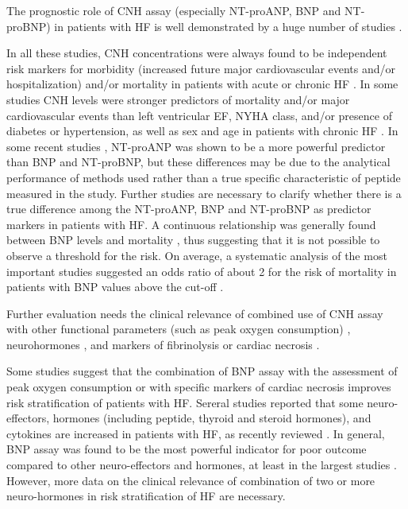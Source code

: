 \documentclass[14pt,a4paper,onecolumn]{extarticle}
\begin{document}
The prognostic role of CNH assay (especially NT-proANP, BNP and NT-proBNP) in
patients with HF is well demonstrated by a huge number of studies \citep{bib316} \citep{bib3147} \citep{bib3186} \citep{bib3187} \citep{bib3188} \citep{bib3189} \citep{bib3190} \citep{bib3191} \citep{bib3192} \citep{bib3193} \citep{bib3194} \citep{bib3195} \citep{bib3196} \citep{bib3197} \citep{bib3198} \citep{bib3199}.

In all these studies, CNH concentrations were always found to be independent risk
markers for morbidity (increased future major cardiovascular events and/or hospitalization) and/or mortality in patients with acute or chronic HF \citep{bib35}. In some studies CNH
levels were stronger predictors of mortality and/or major cardiovascular events than left
ventricular EF, NYHA class, and/or presence of diabetes or hypertension, as well as sex
and age in patients with chronic HF \citep{bib3188} \citep{bib3189} \citep{bib3192} \citep{bib3194} \citep{bib3195} \citep{bib3196} \citep{bib3198} \citep{bib3199}. In some recent studies \citep{bib3197} \citep{bib3199}, NT-proANP was shown to be a more powerful predictor than BNP and
NT-proBNP, but these differences may be due to the analytical performance of methods
used rather than a true specific characteristic of peptide measured in the study. Further
studies are necessary to clarify whether there is a true difference among the NT-proANP,
BNP and NT-proBNP as predictor markers in patients with HF.
A continuous relationship was generally found between BNP levels and mortality
\citep{bib3194}, thus suggesting that it is not possible to observe a threshold for the risk. On average, a systematic analysis of the most important studies suggested an odds ratio of
about 2 for the risk of mortality in patients with BNP values above the cut-off \citep{bib35}.

Further evaluation needs the clinical relevance of combined use of CNH assay with
other functional parameters (such as peak oxygen consumption) \citep{bib390} \citep{bib3201} \citep{bib3202}, neurohormones \citep{bib3203} \citep{bib3204} \citep{bib3205} \citep{bib3206}, and markers of fibrinolysis \citep{bib3207} or cardiac necrosis \citep{bib3208} \citep{bib3209}.

Some studies suggest that the combination of BNP assay with the assessment of peak
oxygen consumption \citep{bib3202} or with specific markers of cardiac necrosis \citep{bib3209} improves
risk stratification of patients with HF.
Sereral studies reported that some neuro-effectors, hormones (including peptide,
thyroid and steroid hormones), and cytokines are increased in patients with HF, as
recently reviewed \citep{bib32} \citep{bib35} \citep{bib3210} \citep{bib3211} \citep{bib3212} \citep{bib3213} \citep{bib3214} \citep{bib3215} \citep{bib3216} \citep{bib3217} \citep{bib3218} \citep{bib3219} \citep{bib3220} . In general, BNP assay was found to be the most powerful indicator
for poor outcome compared to other neuro-effectors and hormones, at least in the
largest studies \citep{bib35} \citep{bib3204} \citep{bib3206}. However, more data on the clinical relevance of combination of two or more neuro-hormones in risk stratification of HF are necessary.
\end{document}
